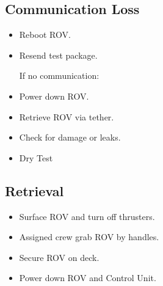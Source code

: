 \subsection{Communication Loss}
\begin{itemize}[label=, leftmargin=0pt, itemindent=15pt]
    \setlength{\itemsep}{0pt}
    \item Reboot ROV.
    \item Resend test package.
  
If no communication:
  
    \item Power down ROV.
    \item Retrieve ROV via tether.
    \item Check for damage or leaks.
    \item Dry Test
\end{itemize}
\subsection{Retrieval}
\begin{itemize}[label=, leftmargin=0pt, itemindent=15pt]
    \setlength{\itemsep}{0pt}
    \item Surface ROV and turn off thrusters.
    \item Assigned crew grab ROV by handles.
    \item Secure ROV on deck.
    \item Power down ROV and Control Unit.
\end{itemize}